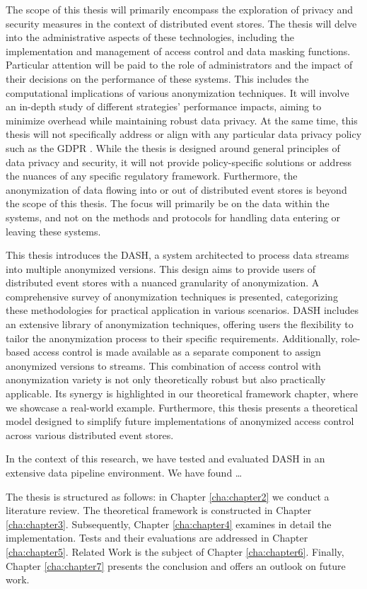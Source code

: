 The scope of this thesis will primarily encompass the exploration of privacy and security measures in the context of distributed event stores. The thesis will delve into the administrative aspects of these technologies, including the implementation and management of access control and data masking functions. Particular attention will be paid to the role of administrators and the impact of their decisions on the performance of these systems. This includes the computational implications of various anonymization techniques. It will involve an in-depth study of different strategies' performance impacts, aiming to minimize overhead while maintaining robust data privacy. At the same time, this thesis will not specifically address or align with any particular data privacy policy such as the \ac{GDPR} \cite{GDPR}. While the thesis is designed around general principles of data privacy and security, it will not provide policy-specific solutions or address the nuances of any specific regulatory framework. Furthermore, the anonymization of data flowing into or out of distributed event stores is beyond the scope of this thesis. The focus will primarily be on the data within the systems, and not on the methods and protocols for handling data entering or leaving these systems. \par
This thesis introduces the \acf{DASH}, a system architected to process data streams into multiple anonymized versions. This design aims to provide users of distributed event stores with a nuanced granularity of anonymization. A comprehensive survey of anonymization techniques is presented, categorizing these methodologies for practical application in various scenarios. \ac{DASH} includes an extensive library of anonymization techniques, offering users the flexibility to tailor the anonymization process to their specific requirements. Additionally, role-based access control is made available as a separate component to assign anonymized versions to streams. This combination of access control with anonymization variety is not only theoretically robust but also practically applicable. Its synergy is highlighted in our theoretical framework chapter, where we showcase a real-world example. Furthermore, this thesis presents a theoretical model designed to simplify future implementations of anonymized access control across various distributed event stores. \par
In the context of this research, we have tested and evaluated \ac{DASH} in an extensive data pipeline environment. We have found \dots \par
The thesis is structured as follows: in Chapter \ref{cha:chapter2} we conduct a literature review. The theoretical framework is constructed in Chapter \ref{cha:chapter3}. Subsequently, Chapter \ref{cha:chapter4} examines in detail the implementation. Tests and their evaluations are addressed in Chapter \ref{cha:chapter5}. Related Work is the subject of Chapter \ref{cha:chapter6}. Finally, Chapter \ref{cha:chapter7} presents the conclusion and offers an outlook on future work.
